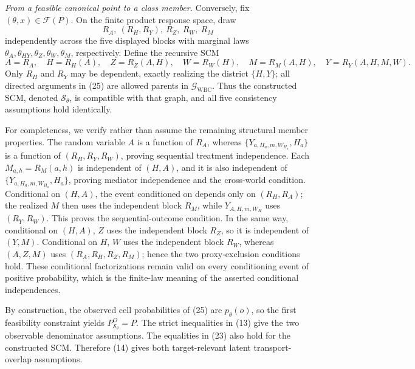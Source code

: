 \emph{From a feasible canonical point to a class member.}
Conversely, fix \((\theta,x)\in\mathcal F(P)\).  On the finite product
response space, draw
\[
 R_A,\ (R_H,R_Y),\ R_Z,\ R_W,\ R_M
\]
independently across the five displayed blocks with marginal laws
\(\theta_A,\theta_{HY},\theta_Z,\theta_W,\theta_M\), respectively.  Define
the recursive SCM
\[
 A=R_A,\quad H=R_H(A),\quad Z=R_Z(A,H),\quad W=R_W(H),\quad
 M=R_M(A,H),\quad Y=R_Y(A,H,M,W).
 \tag{25}
\]
Only \(R_H\) and \(R_Y\) may be dependent, exactly realizing the district
\(\{H,Y\}\); all directed arguments in (25) are allowed parents in
\(\mathcal G_{\mathrm{WBC}}\).  Thus the constructed SCM, denoted
\(\mathcal S_\theta\), is compatible with that graph, and all five
consistency assumptions hold identically.

For completeness, we verify rather than assume the remaining structural
member properties.  The random variable \(A\) is a function of \(R_A\),
whereas \(\{Y_{a,H_a,m,W_{H_a}},H_a\}\) is a function of
\((R_H,R_Y,R_W)\), proving sequential treatment independence.  Each
\(M_{a,h}=R_M(a,h)\) is independent of \((H,A)\), and it is also independent
of \(\{Y_{a,H_a,m,W_{H_a}},H_a\}\), proving mediator independence and the
cross-world condition.  Conditional on \((H,A)\), the event conditioned on
depends only on \((R_H,R_A)\); the realized \(M\) then uses the independent
block \(R_M\), while \(Y_{A,H,m,W_H}\) uses \((R_Y,R_W)\).  This proves
the sequential-outcome condition.  In the same way, conditional on
\((H,A)\), \(Z\) uses the independent block \(R_Z\), so it is independent
of \((Y,M)\).  Conditional on \(H\), \(W\) uses the independent block
\(R_W\), whereas \((A,Z,M)\) uses \((R_A,R_H,R_Z,R_M)\); hence the two
proxy-exclusion conditions hold.  These conditional factorizations remain
valid on every conditioning event of positive probability, which is the
finite-law meaning of the asserted conditional independences.

By construction, the observed cell probabilities of (25) are
\(p_\theta(o)\), so the first feasibility constraint yields
\(P_{\mathcal S_\theta}^O=P\).  The strict inequalities in (13) give the two
observable denominator assumptions.  The equalities in (23) also hold for
the constructed SCM.  Therefore (14) gives both target-relevant latent
transport-overlap assumptions.

